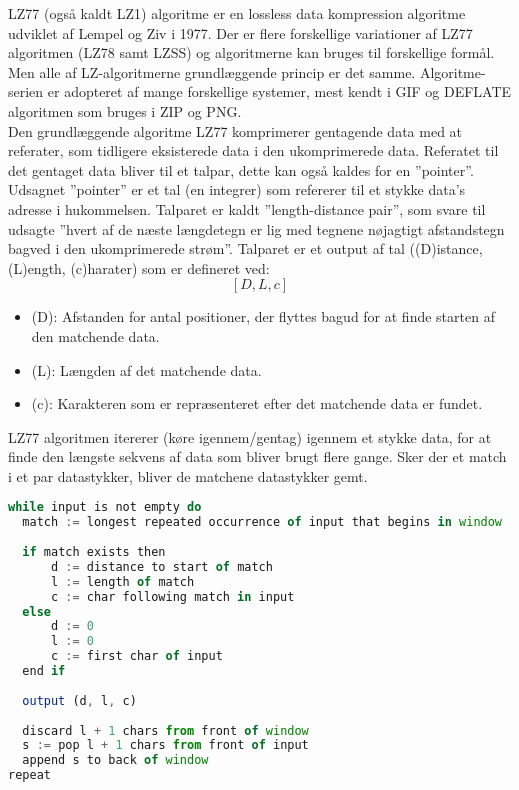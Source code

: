 \documentclass[12pt]{article}
\begin{document}
LZ77 (også kaldt LZ1) algoritme er en lossless data kompression algoritme udviklet af Lempel og Ziv i 1977. 
Der er flere forskellige variationer af LZ77 algoritmen (LZ78 samt LZSS) og algoritmerne kan bruges til forskellige formål. Men alle af LZ-algoritmerne grundlæggende princip er det samme. 
Algoritme-serien er adopteret af mange forskellige systemer, mest kendt i GIF og DEFLATE algoritmen som bruges i ZIP og PNG.\cite*{Wiki/LZ77}\\\newline
Den grundlæggende algoritme LZ77 komprimerer gentagende data med at referater, som tidligere eksisterede data i den ukomprimerede data. Referatet til det gentaget data bliver til et talpar, 
dette kan også kaldes for en ”pointer”. Udsagnet ”pointer” er et tal (en integrer) som refererer til et stykke data’s adresse i hukommelsen. 
Talparet er kaldt ”length-distance pair”, som svare til udsagte ”hvert af de næste længdetegn er lig med tegnene nøjagtigt afstandstegn bagved i den ukomprimerede strøm”. 
Talparet er et output af tal (\boldmath(D)istance, \boldmath(L)ength, \boldmath(c)harater) som er defineret ved:
\[[D,L,c]\] 
\begin{itemize}
  \item \boldmath(D): Afstanden for antal positioner, der flyttes bagud for at finde starten af den matchende data.
  \item \boldmath(L): Længden af det matchende data.
  \item \boldmath(c): Karakteren som er repræsenteret efter det matchende data er fundet.
\end{itemize}
LZ77 algoritmen itererer (køre igennem/gentag) igennem et stykke data, for at finde den længste sekvens af data som bliver brugt flere gange. Sker der et match i et par datastykker, 
bliver de matchene datastykker gemt. 



\begin{lstlisting}[language=JavaScript, caption=LZ77 Pseudocode teoritisk]
while input is not empty do
  match := longest repeated occurrence of input that begins in window
  
  if match exists then
      d := distance to start of match
      l := length of match
      c := char following match in input
  else
      d := 0
      l := 0
      c := first char of input
  end if
  
  output (d, l, c)
  
  discard l + 1 chars from front of window
  s := pop l + 1 chars from front of input
  append s to back of window
repeat

\end{lstlisting}
\printbibliography[title={Litteraturliste}]
\end{document}
